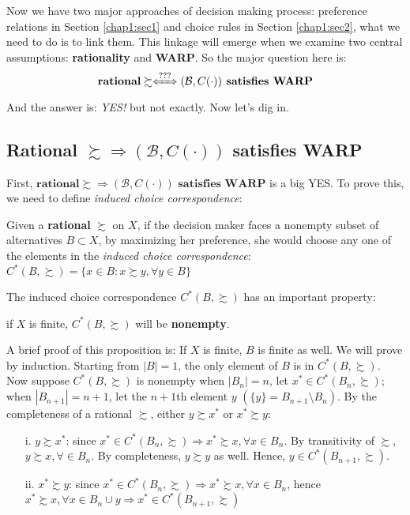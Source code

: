 Now we have two major approaches of decision making process: preference relations in Section \ref{chap1:sec1} and choice rules in Section \ref{chap1:sec2},
what we need to do is to link them. This linkage will emerge when we examine two central assumptions: \textbf{rationality} and \textbf{WARP}. So the major question here is: 
$$\textbf{rational}\succsim\xLeftrightarrow{???} (\mathcal{B},C(\cdot))\textbf{ satisfies WARP}$$
And the answer is: \textit{YES!} but not exactly. Now let's dig in.

\subsection*{Rational $\succsim\Rightarrow(\mathcal{B},C(\cdot))$ satisfies WARP}

First, $\textbf{rational}\succsim \Rightarrow (\mathcal{B},C(\cdot))\textbf{ satisfies WARP}$ is a big YES. To prove this, we need to define \textit{induced choice correspondence}:
\begin{definition}\label{def_induced_choice}
    Given a \textbf{rational} $\succsim$ on $X$, if the decision maker faces a nonempty subset of alternatives $B\subset X$, by maximizing her preference, she would choose any one of the elements in the 
    \textit{induced choice correspondence}: $C^*(B,\succsim)=\{x\in B:x\succsim y, \forall y\in B\}$
\end{definition}

The induced choice correspondence $C^*(B,\succsim)$ has an important property: 
\begin{theorem}
    if $X$ is finite, $C^*(B,\succsim)$ will be \textbf{nonempty}.
\end{theorem}

A brief proof of this proposition is: If $X$ is finite, $B$ is finite as well. We will prove by induction. Starting from $|B|=1$, the only element of $B$ is in $C^*(B,\succsim)$. Now suppose $C^*(B,\succsim)$ is nonempty when $|B_n|=n$, 
let $x^*\in C^*(B_n,\succsim)$; when $|B_{n+1}|=n+1$, let the $n+1$th element $y$ $(\{y\}=B_{n+1}\setminus B_n)$. By the completeness of a rational $\succsim$, either $y\succsim x^*$ or $x^*\succsim y$:
\begin{enumerate}
    \item[i.] $y\succsim x^*$: since $x^*\in C^*(B_n,\succsim)\Rightarrow x^*\succsim x, \forall x\in B_n$. By transitivity of $\succsim$, $y\succsim x,\forall\in B_n$. By completeness, $y\succsim y$ as well. Hence, $y\in C^*(B_{n+1},\succsim)$.
    \item[ii.] $x^*\succsim y$: since $x^*\in C^*(B_n,\succsim)\Rightarrow x^*\succsim x, \forall x\in B_n$, hence $x^*\succsim x, \forall x\in B_n\cup{y}\Rightarrow x^*\in C^*(B_{n+1},\succsim)$
\end{enumerate}

